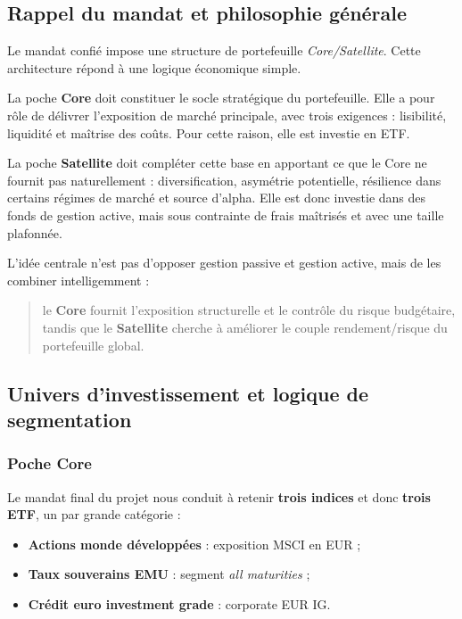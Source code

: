 \documentclass{article}
\begin{document}
\subsection{Rappel du mandat et philosophie générale}

Le mandat confié impose une structure de portefeuille \textit{Core/Satellite}. Cette architecture répond à une logique économique simple.

La poche \textbf{Core} doit constituer le socle stratégique du portefeuille. Elle a pour rôle de délivrer l’exposition de marché principale, avec trois exigences : lisibilité, liquidité et maîtrise des coûts. Pour cette raison, elle est investie en ETF.

La poche \textbf{Satellite} doit compléter cette base en apportant ce que le Core ne fournit pas naturellement : diversification, asymétrie potentielle, résilience dans certains régimes de marché et source d’alpha. Elle est donc investie dans des fonds de gestion active, mais sous contrainte de frais maîtrisés et avec une taille plafonnée.

L’idée centrale n’est pas d’opposer gestion passive et gestion active, mais de les combiner intelligemment :
\begin{quote}
le \textbf{Core} fournit l’exposition structurelle et le contrôle du risque budgétaire, tandis que le \textbf{Satellite} cherche à améliorer le couple rendement/risque du portefeuille global.
\end{quote}

\subsection{Univers d’investissement et logique de segmentation}

\subsubsection{Poche Core}

Le mandat final du projet nous conduit à retenir \textbf{trois indices} et donc \textbf{trois ETF}, un par grande catégorie :
\begin{itemize}
    \item \textbf{Actions monde développées} : exposition MSCI en EUR ;
    \item \textbf{Taux souverains EMU} : segment \textit{all maturities} ;
    \item \textbf{Crédit euro investment grade} : corporate EUR IG.
\end{itemize}
\end{document}
